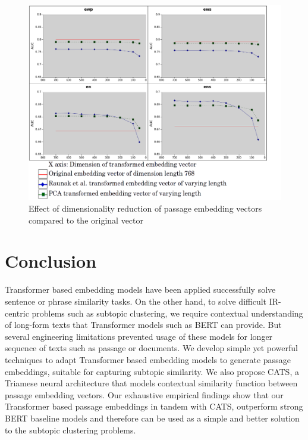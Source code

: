 \documentclass[sigconf,authordraft]{acmart}
\begin{document}
\begin{figure}[h]
  \centering
  \includegraphics[width=\linewidth]{graphics/emb_vec_dim_red_exp.png}
  \caption{Effect of dimensionality reduction of passage embedding vectors compared to the original vector}
  \label{fig:dimred}
\end{figure}

\section{Conclusion} Transformer based embedding models have been applied successfully solve sentence or phrase similarity tasks. On the other hand, to solve difficult IR-centric problems such as subtopic clustering, we require contextual understanding of long-form texts that Transformer models such as BERT can provide. But several engineering limitations prevented usage of these models for longer sequence of texts such as passage or documents. We develop simple yet powerful techniques to adapt Transformer based embedding models to generate passage embeddings, suitable for capturing subtopic similarity. We also propose CATS, a Triamese neural architecture that models contextual similarity function between passage embedding vectors. Our exhaustive empirical findings show that our Transformer based passage embeddings in tandem with CATS, outperform strong BERT baseline models and therefore can be used as a simple and better solution to the subtopic clustering problems.



\end{document}
